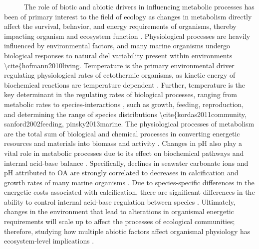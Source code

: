 \documentclass[
  12pt,
]{article}
\begin{document}
~~~~~ The role of biotic and abiotic drivers in influencing metabolic
processes has been of primary interest to the field of ecology as
changes in metabolism directly affect the survival, behavior, and energy
requirements of organisms, thereby impacting organism and ecosystem
function \cite{Carey, Harianto, & Byrne, 2016}. Physiological processes
are heavily influenced by environmental factors, and many marine
organisms undergo biological responses to natural diel variability
present within environments \textbackslash cite\{hofmann2010living.
Temperature is the primary environmental driver regulating physiological
rates of ectothermic organisms, as kinetic energy of biochemical
reactions are temperature dependent
\cite{levins1968evolution, huey1979integrating, hochachka2002biochemical}.
Further, temperature is the key determinant in the regulating rates of
biological processes, ranging from metabolic rates
\cite{gillooly2001effects} to species-interactions
\cite{sanford1999regulation}, such as growth, feeding, reproduction, and
determining the range of species distributions
\textbackslash cite\{kordas2011community, sanford2002feeding,
pinsky2013marine. The physiological processes of metabolism are the
total sum of biological and chemical processes in converting energetic
resources and materials into biomass and activity
\cite{brown2004toward}. Changes in pH also play a vital role in
metabolic processes due to its effect on biochemical pathways and
internal acid-base balance \cite{gaylord2015ocean}. Specifically,
declines in seawater carbonate ions and pH attributed to OA are strongly
correlated to decreases in calcification and growth rates of many marine
organisms \cite{kroeker2013impacts}. Due to species-specific differences
in the energetic costs associated with calcification, there are
significant differences in the ability to control internal acid-base
regulation between species \cite{doney2009ocean}. Ultimately, changes in
the environment that lead to alterations in organismal energetic
requirements will scale up to affect the processes of ecological
communities; therefore, studying how multiple abiotic factors affect
organismal physiology has ecosystem-level implications
\cite{tomanek2002heat, barclay2019variation, kroeker2022ecological}.
\end{document}
